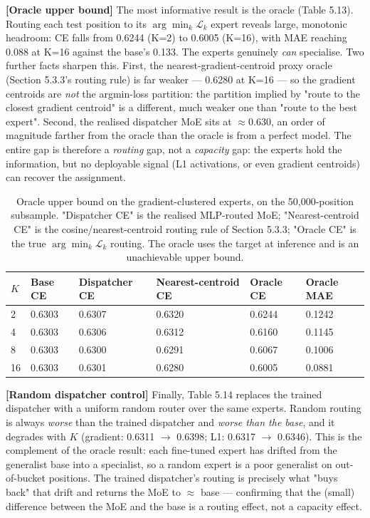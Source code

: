 \textbf{[Oracle upper bound]} The most informative result is the oracle (Table 5.13). Routing each test position to its $\arg\min_k \mathcal{L}_k$ expert reveals large, monotonic headroom: CE falls from 0.6244 (K=2) to 0.6005 (K=16), with MAE reaching 0.088 at K=16 against the base's 0.133. The experts genuinely \emph{can} specialise. Two further facts sharpen this. First, the nearest-gradient-centroid proxy oracle (Section 5.3.3's routing rule) is far weaker — 0.6280 at K=16 — so the gradient centroids are \emph{not} the argmin-loss partition: the partition implied by "route to the closest gradient centroid" is a different, much weaker one than "route to the best expert". Second, the realised dispatcher MoE sits at $\approx$0.630, an order of magnitude farther from the oracle than the oracle is from a perfect model. The entire gap is therefore a \emph{routing} gap, not a \emph{capacity} gap: the experts hold the information, but no deployable signal (L1 activations, or even gradient centroids) can recover the assignment.

\begin{table}[H]
	\centering
	\small
	\begin{tabular}{llllll}
		\toprule
		$K$ & Base CE & Dispatcher CE & Nearest-centroid CE & Oracle CE & Oracle MAE \\
		\midrule
		2 & 0.6303 & 0.6307 & 0.6320 & 0.6244 & 0.1242 \\
		4 & 0.6303 & 0.6306 & 0.6312 & 0.6160 & 0.1145 \\
		8 & 0.6303 & 0.6300 & 0.6291 & 0.6067 & 0.1006 \\
		16 & 0.6303 & 0.6301 & 0.6280 & 0.6005 & 0.0881 \\
		\bottomrule
	\end{tabular}
	\caption{Oracle upper bound on the gradient-clustered experts, on the 50,000-position subsample. "Dispatcher CE" is the realised MLP-routed MoE; "Nearest-centroid CE" is the cosine/nearest-centroid routing rule of Section 5.3.3; "Oracle CE" is the true $\arg\min_k \mathcal{L}_k$ routing. The oracle uses the target at inference and is an unachievable upper bound.}
	\label{tab:5.13}
\end{table}

\textbf{[Random dispatcher control]} Finally, Table 5.14 replaces the trained dispatcher with a uniform random router over the same experts. Random routing is always \emph{worse} than the trained dispatcher and \emph{worse than the base}, and it degrades with $K$ (gradient: 0.6311 $\to$ 0.6398; L1: 0.6317 $\to$ 0.6346). This is the complement of the oracle result: each fine-tuned expert has drifted from the generalist base into a specialist, so a random expert is a poor generalist on out-of-bucket positions. The trained dispatcher's routing is precisely what "buys back" that drift and returns the MoE to $\approx$ base — confirming that the (small) difference between the MoE and the base is a routing effect, not a capacity effect.

